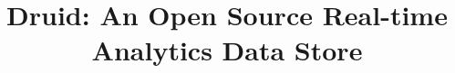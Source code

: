 \documentclass{vldb}
\begin{document}

\title{Druid: An Open Source Real-time Analytics Data Store}



%
%
%
%

\end{document}
